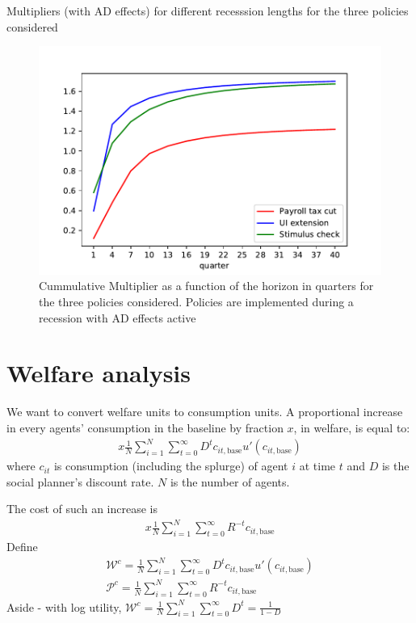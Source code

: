 \documentclass[11pt]{article}
\begin{document}
	\begin{table} 
		\center
		
		\caption{Multipliers (with AD effects) for different recesssion lengths for the three policies considered}
		\label{tab:Multiplier_RecLengths}
	\end{table}
	
	\begin{figure}
		\centering
		\includegraphics[width=0.8\linewidth]{../Code/HA-Models/FromPandemicCode/Figures/Cummulative_multipliers}
		\caption{Cummulative Multiplier as a function of the horizon in quarters for the three policies considered. Policies are implemented during a recession with AD effects active}
		\label{fig:cummulativemultipliers}
	\end{figure}
	
	\FloatBarrier
	\section{Welfare analysis}
	
	We want to convert welfare units to consumption units. A proportional increase in every agents' consumption in the baseline by fraction $x$, in welfare, is equal to:
	\begin{align}
	x\frac{1}{N}\sum_{i=1}^{N} \sum_{t=0}^{\infty} D^t c_{it,\text{base}} u'(c_{it,\text{base}})
	\end{align}
	where $c_{it}$ is consumption (including the splurge) of agent $i$ at time $t$ and $D$ is the social planner's discount rate. $N$ is the number of agents.
	
	
	The cost of such an increase is
	\begin{align}
	x\frac{1}{N}\sum_{i=1}^{N} \sum_{t=0}^{\infty} R^{-t} c_{it,\text{base}}
	\end{align}
	Define
	\begin{align}
	\mathcal{W}^c =\frac{1}{N}\sum_{i=1}^{N} \sum_{t=0}^{\infty} D^t c_{it,\text{base}} u'(c_{it,\text{base}}) \\
	\mathcal{P}^c = \frac{1}{N}\sum_{i=1}^{N} \sum_{t=0}^{\infty} R^{-t} c_{it,\text{base}}
	\end{align}
	Aside - with log utility, $\mathcal{W}^c =\frac{1}{N}\sum_{i=1}^{N} \sum_{t=0}^{\infty} D^t = \frac{1}{1-D}$
	
\end{document}
